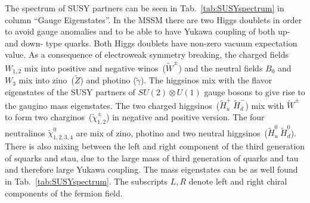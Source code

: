 The spectrum of SUSY partners can be seen in Tab.~\ref{tab:SUSYspectrum} in column ``Gauge Eigenstates''. In the MSSM there are two Higgs doublets in order to avoid gauge anomalies and to be able to have Yukawa coupling of both up- and down- type quarks. Both Higgs doublets have non-zero vacuum expectation value. As a consequence of electroweak symmetry breaking, the charged fields $W_{1,2}$ mix into positive and negative winos~($\tilde{W}^{\pm}$) and the neutral fields $B_{0}$ and $W_{3}$ mix into zino~($\tilde{Z}$) and photino ($\tilde{\gamma}$). The higgsinos mix with the flavor eigenstates of the SUSY partners of $SU(2) \otimes U(1)$ gauge bosons to give rise to the gaugino mass eigenstates. The two charged higgsinos~($\tilde{H}_{u}^{+}~\tilde{H}_{d}^{-}$) mix with $\tilde{W}^{\pm}$ to form two charginos~($\tilde{\chi}_{1,2}^{\pm}$) in negative and positive version. The four neutralinos $\tilde{\chi}_{1,2,3,4}^{0}$ are mix of zino, photino and two neutral higgsinos~($\tilde{H}_{u}^{0}~\tilde{H}_{d}^{0}$). There is also mixing between the left and right component of the third generation of squarks and stau, due to the large mass of third generation of quarks and tau and therefore large Yukawa coupling. The mass eigenstates can be as well found in Tab.~\ref{tab:SUSYspectrum}. The subscripts $L,R$ denote left and right chiral components of the fermion field.

